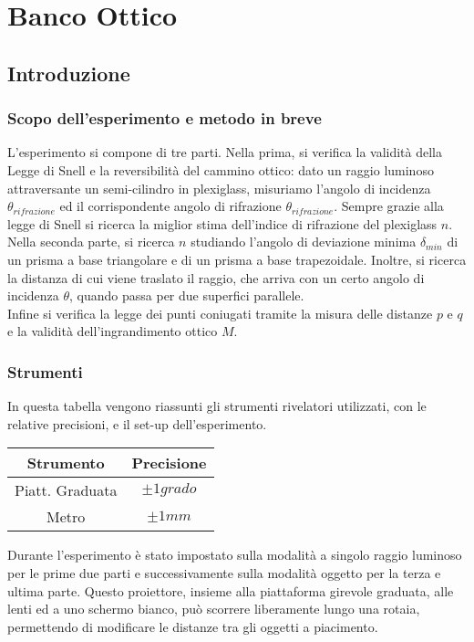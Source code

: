 
\chapter{Banco Ottico}
\section{Introduzione}
\subsection{Scopo dell'esperimento e metodo in breve}

L'esperimento si compone di tre parti. Nella prima, si verifica la validità della Legge di Snell e la reversibilità del cammino ottico: dato un raggio luminoso attraversante un semi-cilindro in plexiglass, misuriamo l'angolo di incidenza $\theta_{rifrazione}$ ed il corrispondente  angolo di rifrazione $\theta_{rifrazione}$. Sempre grazie alla legge di Snell si ricerca la miglior stima dell'indice di rifrazione del plexiglass $n$.
\\

Nella seconda parte, si ricerca $n$ studiando l'angolo di deviazione minima $\delta_{min}$ di un prisma a base triangolare e di un prisma a base trapezoidale. Inoltre, si ricerca la distanza di cui viene traslato il raggio, che arriva con un certo angolo di incidenza $\theta$, quando passa per due superfici parallele.
\\

Infine si verifica la legge dei punti coniugati tramite la misura delle distanze $p$ e $q$ e la validità dell'ingrandimento ottico $M$. 

\subsection{Strumenti}
In questa tabella vengono riassunti gli strumenti rivelatori utilizzati, con le relative precisioni, e il set-up dell'esperimento.
\begin{center}
\begin{tabular}{c|c}
Strumento & Precisione \\
\midrule
Piatt. Graduata & $\pm 1 grado $ \\
Metro & $\pm 1 mm $\\
\end{tabular}
\end{center}

Durante l'esperimento è stato impostato sulla modalità a singolo raggio luminoso per le prime due parti e successivamente sulla modalità oggetto per la terza e ultima parte. 
Questo proiettore, insieme alla piattaforma girevole graduata, alle lenti ed a uno schermo bianco, può scorrere liberamente lungo una rotaia, permettendo di modificare le distanze tra gli oggetti a piacimento.

